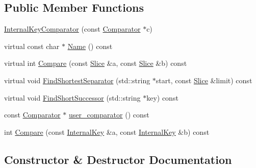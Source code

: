 \subsection*{Public Member Functions}
\begin{DoxyCompactItemize}
\item 
\mbox{\hyperlink{classleveldb_1_1_internal_key_comparator_a0069a8b4828f592da66937e2c3471080}{Internal\+Key\+Comparator}} (const \mbox{\hyperlink{structleveldb_1_1_comparator}{Comparator}} $\ast$c)
\item 
virtual const char $\ast$ \mbox{\hyperlink{classleveldb_1_1_internal_key_comparator_ae8848b098c0c20071aa93a166b80de0d}{Name}} () const
\item 
virtual int \mbox{\hyperlink{classleveldb_1_1_internal_key_comparator_a8ee088d285165f692f2f03ac5b3e13b1}{Compare}} (const \mbox{\hyperlink{classleveldb_1_1_slice}{Slice}} \&a, const \mbox{\hyperlink{classleveldb_1_1_slice}{Slice}} \&b) const
\item 
virtual void \mbox{\hyperlink{classleveldb_1_1_internal_key_comparator_a876984ae99b1404b4074be4d92cab421}{Find\+Shortest\+Separator}} (std\+::string $\ast$start, const \mbox{\hyperlink{classleveldb_1_1_slice}{Slice}} \&limit) const
\item 
virtual void \mbox{\hyperlink{classleveldb_1_1_internal_key_comparator_a221a28a524474834b2cba5c3be84cb13}{Find\+Short\+Successor}} (std\+::string $\ast$key) const
\item 
const \mbox{\hyperlink{structleveldb_1_1_comparator}{Comparator}} $\ast$ \mbox{\hyperlink{classleveldb_1_1_internal_key_comparator_ac8c5db699e5defed74c6b17ddadf90f8}{user\+\_\+comparator}} () const
\item 
int \mbox{\hyperlink{classleveldb_1_1_internal_key_comparator_a715d8e2eb246df39248ce54789fb4621}{Compare}} (const \mbox{\hyperlink{classleveldb_1_1_internal_key}{Internal\+Key}} \&a, const \mbox{\hyperlink{classleveldb_1_1_internal_key}{Internal\+Key}} \&b) const
\end{DoxyCompactItemize}


\subsection{Constructor \& Destructor Documentation}
\mbox{\label{classleveldb_1_1_internal_key_comparator_a0069a8b4828f592da66937e2c3471080}} 
